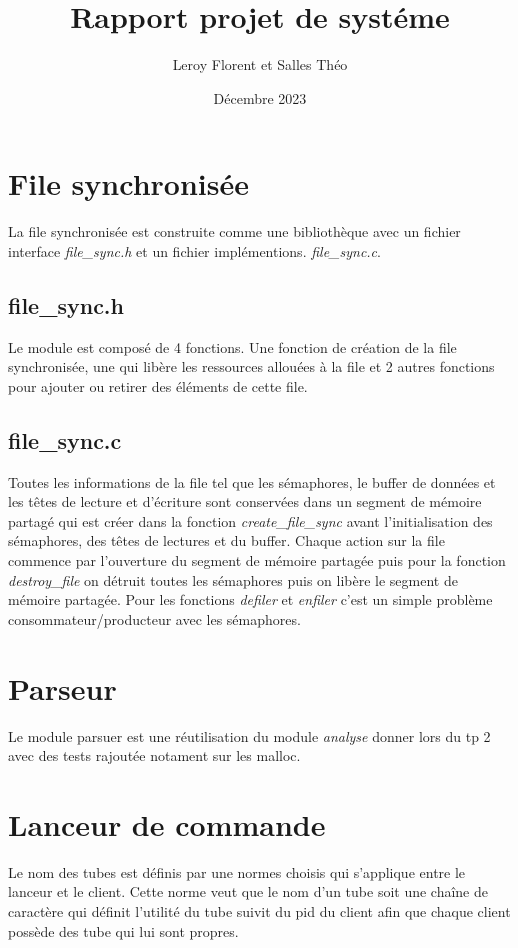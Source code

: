 \documentclass[12pt]{article}
\title{Rapport projet de systéme}
\author{Leroy Florent et Salles Théo}
\date{Décembre 2023}
\begin{document}
\maketitle
\tableofcontents
\newpage
\section{File synchronisée}
La file synchronisée est construite comme une bibliothèque avec un fichier
interface \textit{file\_sync.h} et un fichier implémentions.
\textit{file\_sync.c}.
\subsection{file\_sync.h}
Le module est composé de 4 fonctions. Une fonction de création de la file
synchronisée, une qui libère les ressources allouées à la file et 2 autres
fonctions pour ajouter
ou retirer des éléments de cette file.
\subsection{file\_sync.c}
Toutes les informations de la file tel que les sémaphores, le buffer de données
et les
têtes de lecture
et d'écriture sont conservées dans un segment de mémoire partagé qui est créer
dans la fonction \textit{create\_file\_sync} avant l'initialisation des
sémaphores,
des têtes de lectures et du buffer.
Chaque action sur la file commence par l'ouverture du segment de mémoire
partagée
puis pour la fonction \textit{destroy\_file} on détruit toutes les sémaphores
puis on libère le segment de mémoire partagée. Pour les fonctions
\textit{defiler} et \textit{enfiler}
c'est un simple problème consommateur/producteur avec les sémaphores.
\section{Parseur}
Le module parsuer est une réutilisation du module \textit{analyse} donner lors
du tp 2
avec des tests rajoutée notament sur les malloc.
\section{Lanceur de commande}
Le nom des tubes est définis par une normes choisis qui s'applique
entre le lanceur et le client. Cette norme veut que le nom d'un tube soit une
chaîne de caractère qui
définit l'utilité du tube suivit du pid du client afin que chaque client
possède des tube qui lui sont propres.
\end{document}
